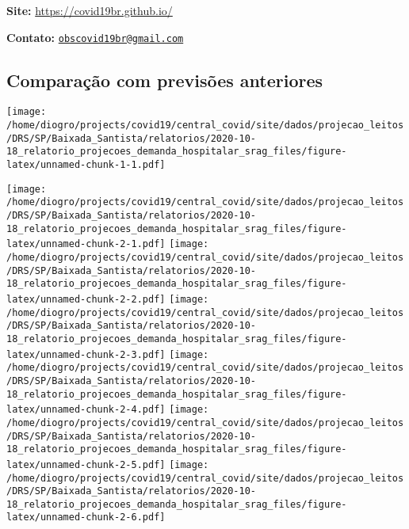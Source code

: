 \documentclass[
]{article}
\begin{document}
\textbf{Site:} \url{https://covid19br.github.io/}

\textbf{Contato:}
\href{mailto:obscovid19br@gmail.com}{\nolinkurl{obscovid19br@gmail.com}}

\hypertarget{comparauxe7uxe3o-com-previsuxf5es-anteriores}{%
\subsection{Comparação com previsões
anteriores}\label{comparauxe7uxe3o-com-previsuxf5es-anteriores}}

\texttt{[image: /home/diogro/projects/covid19/central\_covid/site/dados/projecao\_leitos/DRS/SP/Baixada\_Santista/relatorios/2020-10-18\_relatorio\_projecoes\_demanda\_hospitalar\_srag\_files/figure-latex/unnamed-chunk-1-1.pdf]}

\newpage

\texttt{[image: /home/diogro/projects/covid19/central\_covid/site/dados/projecao\_leitos/DRS/SP/Baixada\_Santista/relatorios/2020-10-18\_relatorio\_projecoes\_demanda\_hospitalar\_srag\_files/figure-latex/unnamed-chunk-2-1.pdf]}
\texttt{[image: /home/diogro/projects/covid19/central\_covid/site/dados/projecao\_leitos/DRS/SP/Baixada\_Santista/relatorios/2020-10-18\_relatorio\_projecoes\_demanda\_hospitalar\_srag\_files/figure-latex/unnamed-chunk-2-2.pdf]}
\texttt{[image: /home/diogro/projects/covid19/central\_covid/site/dados/projecao\_leitos/DRS/SP/Baixada\_Santista/relatorios/2020-10-18\_relatorio\_projecoes\_demanda\_hospitalar\_srag\_files/figure-latex/unnamed-chunk-2-3.pdf]}
\texttt{[image: /home/diogro/projects/covid19/central\_covid/site/dados/projecao\_leitos/DRS/SP/Baixada\_Santista/relatorios/2020-10-18\_relatorio\_projecoes\_demanda\_hospitalar\_srag\_files/figure-latex/unnamed-chunk-2-4.pdf]}
\texttt{[image: /home/diogro/projects/covid19/central\_covid/site/dados/projecao\_leitos/DRS/SP/Baixada\_Santista/relatorios/2020-10-18\_relatorio\_projecoes\_demanda\_hospitalar\_srag\_files/figure-latex/unnamed-chunk-2-5.pdf]}
\texttt{[image: /home/diogro/projects/covid19/central\_covid/site/dados/projecao\_leitos/DRS/SP/Baixada\_Santista/relatorios/2020-10-18\_relatorio\_projecoes\_demanda\_hospitalar\_srag\_files/figure-latex/unnamed-chunk-2-6.pdf]}
\end{document}
